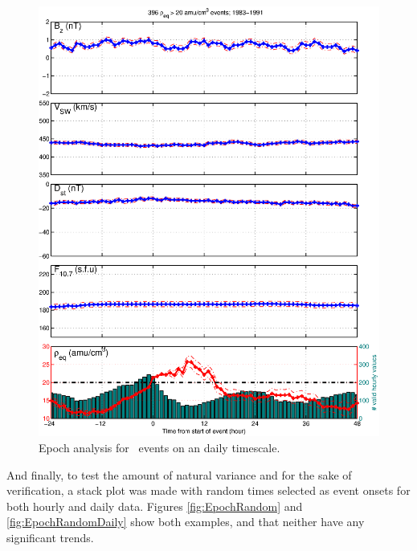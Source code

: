 \begin{figure}[htp!]
	\centering
	\includegraphics[width=1\linewidth]{Figures/StormAvs/stormavs-mass-gt20-GOES6}
	\caption{Epoch analysis for \req\ events on an daily timescale.}
	\label{fig:EpochRho}
\end{figure}

And finally, to test the amount of natural variance and for the sake of verification, a stack plot was made with random times selected as event onsets for both hourly and daily data. Figures \ref{fig:EpochRandom} and \ref{fig:EpochRandomDaily} show both examples, and that neither have any significant trends.

